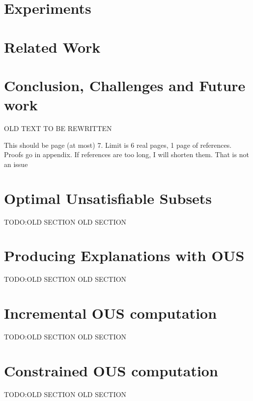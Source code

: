 \documentclass{article}
\newcommand\ignore[1]{}
\newcommand\comment[1]{\marginpar{\parbox{\marginparwidth}{\tiny #1}}}
\renewcommand\comment[1]{#1}
\newcommand{\todo}[1]{{\comment{\color{red}\textsc{TODO:}#1} }}
\begin{document}
\section{Experiments}
\label{sec:experiments}

%  

\section{Related Work}\label{sec:related}



\section{Conclusion, Challenges and Future work}\label{sec:conclusion}
{\color{OliveGreen} OLD TEXT TO BE REWRITTEN

}

\newpage
{\color{red}This should be page (at most) 7. Limit is 6 real pages, 1 page of references. Proofs go in appendix. If references are too long, I will shorten them. That is not an issue}
\newpage

{
\footnotesize

 
}
% 





\color{red}
\section{Optimal Unsatisfiable Subsets}\label{sec:omus}
\todo{OLD SECTION}OLD SECTION


\section{Producing Explanations with OUS}\label{sec:Greedy}\label{sec:explain}
\todo{OLD SECTION}OLD SECTION



\section{Incremental OUS computation} \label{sec:incremental}
\todo{OLD SECTION}OLD SECTION


\section{Constrained OUS computation} \label{sec:constrained}
\todo{OLD SECTION}OLD SECTION

\end{document}
